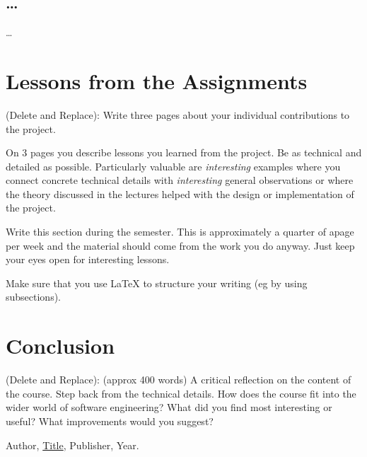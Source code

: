 \documentclass{article}
\theoremstyle{theorem}
\theoremstyle{definition}
\theoremstyle{remark}
\begin{document}

\subsection{\ldots}

\ldots

\section{Lessons from the Assignments}

(Delete and Replace): Write three pages about your individual contributions to the project.

On 3 pages you describe lessons you learned from the project. Be as technical and detailed as possible. Particularly valuable are \emph{interesting} examples where you connect concrete technical details with \emph{interesting} general observations or where the theory discussed in the lectures helped with the design or implementation of the project.

Write this section during the semester. This is approximately a quarter of apage per week and the material should come from the work you do anyway. Just keep your eyes open for interesting lessons.

Make sure that you use \LaTeX{} to structure your writing (eg by using subsections).

\section{Conclusion}\label{conclusion}

(Delete and Replace): (approx 400 words) A critical reflection on the content of the course. Step back from the technical details. How does the course fit into the wider world of software engineering? What did you find most interesting or useful? What improvements would you suggest?

\begin{thebibliography}{99}
 Author, \href{https://en.wikipedia.org/wiki/LaTeX}{Title}, Publisher, Year.
\end{thebibliography}
\end{document}
